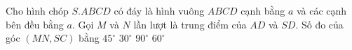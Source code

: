 \begin{ex}%
	Cho hình chóp $S.ABCD$ có đáy là hình vuông $ABCD$ cạnh bằng $a$ và các cạnh bên đều bằng $a$. Gọi $M$  và $N$ lần lượt là trung điểm của $AD$ và $SD$. Số đo của góc $(MN, SC)$ bằng
	 \choice
		{$45^\circ$} 
		 {$30^\circ$}
		 {\True $90^\circ$}
		{$60^\circ$} 
\end{ex}

